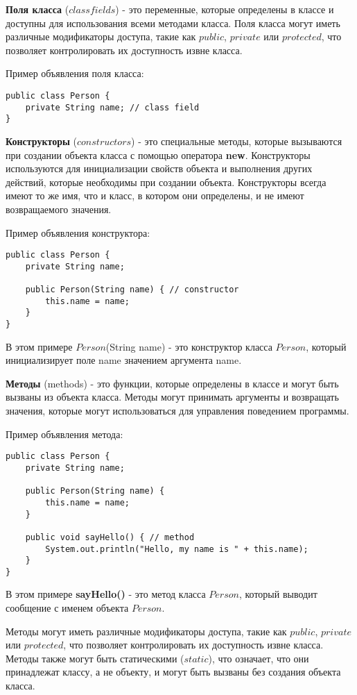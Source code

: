 \documentclass[12pt, a4paper]{book}%
\begin{document}
{{\bf Поля класса} ($class fields$) - это переменные, которые определены в классе и доступны для использования всеми методами класса. Поля класса могут иметь различные модификаторы доступа, такие как $public$, $private$ или $protected$, что позволяет контролировать их доступность извне класса.

Пример объявления поля класса:

\begin{lstlisting}
public class Person {
    private String name; // class field
}
\end{lstlisting}
\newpage
{\bf Конструкторы} ($constructors$) - это специальные методы, которые вызываются при создании объекта класса с помощью оператора {\bf new}. Конструкторы используются для инициализации свойств объекта и выполнения других действий, которые необходимы при создании объекта. Конструкторы всегда имеют то же имя, что и класс, в котором они определены, и не имеют возвращаемого значения.

Пример объявления конструктора:

\begin{lstlisting}
public class Person {
    private String name;

    public Person(String name) { // constructor
        this.name = name;
    }
}
\end{lstlisting}

В этом примере $Person$(String name) - это конструктор класса $Person$, который инициализирует поле name значением аргумента name.

{\bf Методы} (methods) - это функции, которые определены в классе и могут быть вызваны из объекта класса. Методы могут принимать аргументы и возвращать значения, которые могут использоваться для управления поведением программы.

Пример объявления метода:

\begin{lstlisting}
public class Person {
    private String name;

    public Person(String name) {
        this.name = name;
    }

    public void sayHello() { // method
        System.out.println("Hello, my name is " + this.name);
    }
}
\end{lstlisting}

В этом примере {\bf sayHello()} - это метод класса $Person$, который выводит сообщение с именем объекта $Person$.

Методы могут иметь различные модификаторы доступа, такие как $public$, $private$ или $protected$, что позволяет контролировать их доступность извне класса. Методы также могут быть статическими ($static$), что означает, что они принадлежат классу, а не объекту, и могут быть вызваны без создания объекта класса.

}
\end{document}
